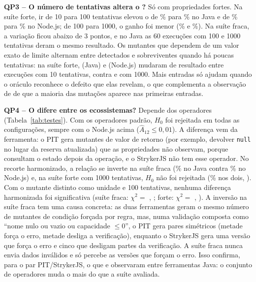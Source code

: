 \textbf{QP3 -- O número de tentativas altera o \ms{}?} Só com propriedades fortes. Na suíte forte, ir de 10 para 100 tentativas elevou o \ms{} de \msJavaForteDez\% para \msJavaForteCem\% no Java e de \msNodeForteDez\% para \msNodeForteCem\% no Node.js; de 100 para 1000, o ganho foi menor (\msJavaForteMil\% e \msNodeForteMil\%). Na suíte fraca, a variação ficou abaixo de 3 pontos, e no Java as 60 execuções com 100 e 1000 tentativas deram o mesmo resultado. Os mutantes que dependem de um valor exato de limite alternam entre detectados e sobreviventes quando há poucas tentativas: na suíte forte, \instJavaForteDez{} (Java) e \instNodeForteDez{} (Node.js) mudaram de resultado entre execuções com 10 tentativas, contra \instJavaForteMil{} e \instNodeForteMil{} com 1000. Mais entradas só ajudam quando o oráculo reconhece o defeito que elas revelam, o que complementa a observação de \citet{ravi2025pbt} de que a maioria das mutações aparece nas primeiras entradas.

\textbf{QP4 -- O \ms{} difere entre os ecossistemas?} Depende dos operadores (Tabela~\ref{tab:testes}). Com os operadores padrão, $H_0$ foi rejeitada em todas as configurações, sempre com o Node.js acima ($\hat{A}_{12} \le 0{,}01$). A diferença vem da ferramenta: o PIT gera mutantes de valor de retorno (por exemplo, devolver \texttt{null} no lugar da reserva atualizada) que as propriedades não observam, porque consultam o estado depois da operação, e o StrykerJS não tem esse operador. No recorte harmonizado, a relação se inverte na suíte fraca (\mshJavaFracaCem\% no Java contra \mshNodeFracaCem\% no Node.js) e, na suíte forte com 1000 tentativas, $H_0$ não foi rejeitada (\mshJavaForteMil\% nos dois, \pEcoForteMilHarm). Com o mutante distinto como unidade e 100 tentativas, nenhuma diferença harmonizada foi significativa (suíte fraca: $\chi^2 = $ \chiFraca, \pchiFraca; forte: $\chi^2 = $ \chiForte, \pchiForte). A inversão na suíte fraca tem uma causa concreta: as duas ferramentas geram o mesmo número de mutantes de condição forçada por regra, mas, numa validação composta como ``nome nulo ou vazio ou capacidade $\le 0$'', o PIT gera pares simétricos (metade força o erro, metade desliga a verificação), enquanto o StrykerJS gera uma versão que força o erro e cinco que desligam partes da verificação. A suíte fraca nunca envia dados inválidos e só percebe as versões que forçam o erro. Isso confirma, para o par PIT/StrykerJS, o que \citet{kintis2018tools} e \citet{monteiro2022tools} observaram entre ferramentas Java: o conjunto de operadores muda o \ms{} mais do que a suíte avaliada.

